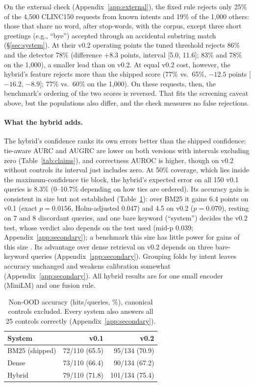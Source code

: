 On the external check (Appendix~\ref{app:external}), the fixed rule rejects only 25\% of the 4,500 CLINC150
requests from known intents and 19\% of the 1,000 others: those that share no word, after stop-words,
with the corpus, except three short greetings (e.g., ``bye'') accepted through an accidental substring match
(\S\ref{sec:system}). At their v0.2 operating points the tuned threshold rejects 86\% and the detector 78\%
(difference $+8.3$ points, interval [5.0, 11.6]; 83\% and 78\% on the 1,000), a smaller lead than on v0.2. At
equal v0.2 cost, however, the hybrid's feature rejects more than the shipped score (77\% vs.\ 65\%, $-12.5$
points [$-16.2$, $-8.9$]; 77\% vs.\ 60\% on the 1,000). On these requests, then, the benchmark's ordering of
the two scores is reversed. That fits the screening caveat above, but the populations also differ, and the
check measures no false rejections.

\paragraph{What the hybrid adds.} The hybrid's confidence ranks its own errors better than the shipped confidence:
tie-aware AURC and AUGRC are lower on both versions with intervals excluding zero (Table~\ref{tab:claims}), and
correctness AUROC is higher, though on v0.2 without controls its interval just includes zero. At 50\% coverage, which
lies inside the maximum-confidence tie block, the hybrid's expected error on all 150 v0.1 queries is 8.3\% (0--10.7\%
depending on how ties are ordered). Its accuracy gain is consistent in size but not established (Table~\ref{tab:acc}): over BM25 it
gains 6.4 points on v0.1 (exact $p=0.0156$, Holm-adjusted 0.047) and 4.5 on v0.2 ($p=0.070$), resting on 7 and 8
discordant queries, and one bare keyword (``system'') decides the v0.2 test, whose verdict also depends on the test used (mid-p 0.039; Appendix~\ref{app:secondary});
a benchmark this size has little power
for gains of this size \citep{card2020littlepower}. Its advantage over dense retrieval on v0.2 depends on three
bare-keyword queries (Appendix~\ref{app:secondary}). Grouping folds by intent leaves accuracy unchanged and weakens
calibration somewhat (Appendix~\ref{app:secondary}). All hybrid results are for one small encoder (MiniLM) and one
fusion rule.

\begin{table}[t]
  \centering
  \small
  \setlength{\tabcolsep}{4pt}
  \begin{tabular}{@{}lrr@{}}
    \toprule
    \textbf{System} & \textbf{v0.1} & \textbf{v0.2} \\
    \midrule
    BM25 (shipped) & 72/110 (65.5) & 95/134 (70.9) \\
    Dense          & 73/110 (66.4) & 90/134 (67.2) \\
    Hybrid         & 79/110 (71.8) & 101/134 (75.4) \\
    \bottomrule
  \end{tabular}
  \caption{Non-OOD accuracy (hits/queries, \%), canonical controls excluded. Every system also answers all 25
  controls correctly (Appendix~\ref{app:secondary}).}
  \label{tab:acc}
\end{table}

